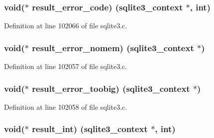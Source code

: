 \subsubsection[{result\+\_\+error\+\_\+code}]{\setlength{\rightskip}{0pt plus 5cm}void($\ast$ result\+\_\+error\+\_\+code) ({\bf sqlite3\+\_\+context} $\ast$, int)}\label{structsqlite3__api__routines_a3b70121ec78ad5f66bf83ecb90aba6b5}


Definition at line 102066 of file sqlite3.\+c.

\hypertarget{structsqlite3__api__routines_a9c42918f230eb77d09c0f46d85ebbac9}{}
\subsubsection[{result\+\_\+error\+\_\+nomem}]{\setlength{\rightskip}{0pt plus 5cm}void($\ast$ result\+\_\+error\+\_\+nomem) ({\bf sqlite3\+\_\+context} $\ast$)}\label{structsqlite3__api__routines_a9c42918f230eb77d09c0f46d85ebbac9}


Definition at line 102057 of file sqlite3.\+c.

\hypertarget{structsqlite3__api__routines_a3bc7020e5cbc0cbc74fc06d747a1d275}{}
\subsubsection[{result\+\_\+error\+\_\+toobig}]{\setlength{\rightskip}{0pt plus 5cm}void($\ast$ result\+\_\+error\+\_\+toobig) ({\bf sqlite3\+\_\+context} $\ast$)}\label{structsqlite3__api__routines_a3bc7020e5cbc0cbc74fc06d747a1d275}


Definition at line 102058 of file sqlite3.\+c.

\hypertarget{structsqlite3__api__routines_aebada6b302203c8ba65aa99ffd4e9c77}{}
\subsubsection[{result\+\_\+int}]{\setlength{\rightskip}{0pt plus 5cm}void($\ast$ result\+\_\+int) ({\bf sqlite3\+\_\+context} $\ast$, int)}\label{structsqlite3__api__routines_aebada6b302203c8ba65aa99ffd4e9c77}


